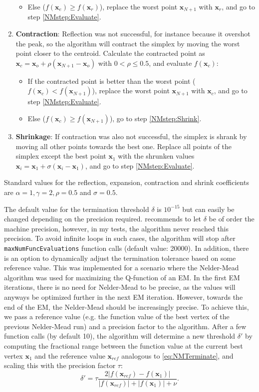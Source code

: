 \documentclass[a4paper,11pt]{article}
\def\x{\boldsymbol{x}}
\newcommand{\privparam}[1]{\texttt{\textunderscore #1}}
\begin{document}
\begin{enumerate}
\begin{itemize}
  \item Else ($f(\x_e) \geq f(\x_r)$), replace the worst point $\x_{N+1}$ with $\x_r$, and go to step \ref{NMstep:Evaluate}.
 \end{itemize}
 \item \label{NMstep:Contraction} \textbf{Contraction}: Reflection was not successful, for instance because it overshot the peak, so the algorithm will contract the simplex by moving the worst point closer to the centroid. Calculate the contracted point as $\x_c = \x_o + \rho(\x_{N+1} - \x_o)$ with $0 < \rho \leq 0.5$, and evaluate $f(\x_c)$:
 \begin{itemize}
  \item If the contracted point is better than the worst point ($f(\x_c) < f(\x_{N+1})$), replace the worst point $\x_{N+1}$ with $\x_c$, and go to step \ref{NMstep:Evaluate}.
  \item Else ($f(\x_c) \geq f(\x_{N+1})$), go to step \ref{NMstep:Shrink}.
 \end{itemize}
    \item \label{NMstep:Shrink} \textbf{Shrinkage}: If contraction was also not successful, the simplex is shrank by moving all other points towards the best one. Replace all points of the simplex except the best point $\x_1$ with the shrunken values $\x_i = \x_1 + \sigma(\x_i - \x_1)$, and go to step \ref{NMstep:Evaluate}.
\end{enumerate}

Standard values for the reflection, expansion, contraction and shrink coefficients are $\alpha = 1, \gamma = 2, \rho = 0.5$ and $\sigma = 0.5$.

The default value for the termination threshold $\delta$ is $10^{-15}$ but can easily be changed depending on the precision required. \cite{Press2007} recommends to let $\delta$ be of order the machine precision, however, in my tests, the algorithm never reached this precision. To avoid infinite loops in such cases, the algorithm will stop after \privparam{maxNumFuncEvaluations} function calls (default value: 20000). In addition, there is an option to dynamically adjust the termination tolerance based on some reference value. This was implemented for a scenario where the Nelder-Mead algorithm was used for maximizing the Q-function of an EM. In the first EM iterations, there is no need for Nelder-Mead to be precise, as the values will anyways be optimized further in the next EM iteration. However, towards the end of the EM, the Nelder-Mead should be increasingly precise. To achieve this, we pass a reference value (e.g. the function value of the best vertex of the previous Nelder-Mead run) and a precision factor to the algorithm. After a few function calls (by default 10), the algorithm will determine a new threshold $\delta'$ by computing the fractional range between the function value at the current best vertex $\x_1$ and the reference value $\x_{ref}$ analogous to \eqref{eq:NMTerminate}, and scaling this with the precision factor $\tau$:
\begin{equation*}
\delta' = \tau \dfrac{2|f(\x_{ref}) - f(\x_1)|}{|f(\x_{ref})| + |f(\x_1)| + \nu}.
\end{equation*}
\end{document}
